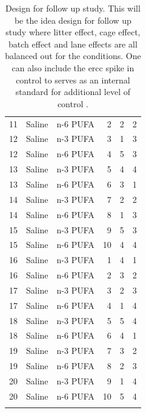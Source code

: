 \begin{center}
\begin{longtable}[H]{rrrrrr}
			    11    & Saline & n-6 PUFA & 2     & 2     & 2 \\
			    12    & Saline & n-3 PUFA & 3     & 1     & 3 \\
			    12    & Saline & n-6 PUFA & 4     & 5     & 3 \\
			    13    & Saline & n-3 PUFA & 5     & 4     & 4 \\
			    13    & Saline & n-6 PUFA & 6     & 3     & 1 \\
			    14    & Saline & n-3 PUFA & 7     & 2     & 2 \\
			    14    & Saline & n-6 PUFA & 8     & 1     & 3 \\
			    15    & Saline & n-3 PUFA & 9     & 5     & 3 \\
			    15    & Saline & n-6 PUFA & 10    & 4     & 4 \\
			    16    & Saline & n-3 PUFA & 1     & 4     & 1 \\
			    16    & Saline & n-6 PUFA & 2     & 3     & 2 \\
			    17    & Saline & n-3 PUFA & 3     & 2     & 3 \\
			    17    & Saline & n-6 PUFA & 4     & 1     & 4 \\
			    18    & Saline & n-3 PUFA & 5     & 5     & 4 \\
			    18    & Saline & n-6 PUFA & 6     & 4     & 1 \\
			    19    & Saline & n-3 PUFA & 7     & 3     & 2 \\
			    19    & Saline & n-6 PUFA & 8     & 2     & 3 \\
			    20    & Saline & n-3 PUFA & 9     & 1     & 4 \\
			    20    & Saline & n-6 PUFA & 10    & 5     & 4 \\
			\bottomrule
		\caption[Design for Follow Up Study]{
			Design for follow up study.
			This will be the idea design for follow up study where litter effect, cage effect, batch effect and lane effects are all balanced out for the conditions.
			One can also include the \gls{ercc} spike in control to serves as an internal standard for additional level of control \citep{Jiang2011a}.
			}
		\label{tab:bestdesign}%
	\end{longtable}%
\end{center}
